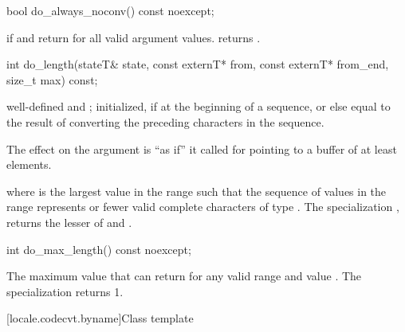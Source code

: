 %
\begin{itemdecl}
bool do_always_noconv() const noexcept;
\end{itemdecl}

\begin{itemdescr}
\pnum
\returns
{}
if
and
return
for all valid argument values.
returns
.
\end{itemdescr}

%
\begin{itemdecl}
int do_length(stateT& state, const externT* from, const externT* from_end,
              size_t max) const;
\end{itemdecl}

\begin{itemdescr}
\pnum
\requires
{}
well-defined and
;
 initialized, if at the beginning of a sequence, or else equal to
the result of converting the preceding characters in the sequence.

\pnum
\effects
The effect on the  argument is ``as if'' it called
for  pointing to a buffer of at least  elements.

\pnum
\returns
{}
where
is the largest value in the range
such that the sequence of values in the range
represents
or fewer valid complete characters of type
.
The specialization
,
returns the lesser of
and
.
\end{itemdescr}

%
\begin{itemdecl}
int do_max_length() const noexcept;
\end{itemdecl}

\begin{itemdescr}
\pnum
\returns
The maximum value that
can return for any valid range
and
value
.
The specialization
returns 1.
\end{itemdescr}

[locale.codecvt.byname]{Class template }

